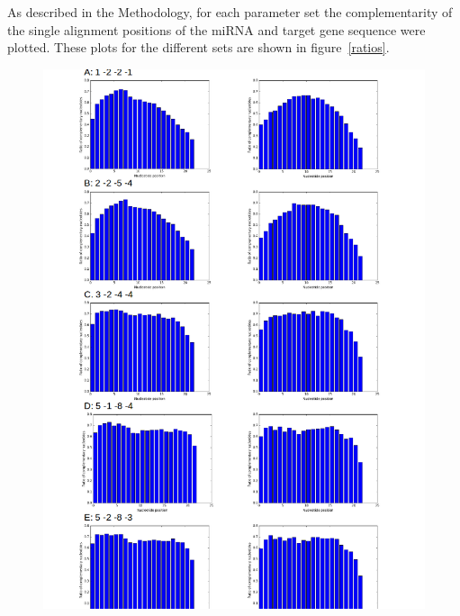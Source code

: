 \documentclass[12pt]{article}
\begin{document}
As described in the Methodology, for each parameter set the complementarity of the single alignment positions of the miRNA and target gene sequence were plotted. These plots for the different sets are shown in figure~\ref{ratios}.

\begin{figure}
\vspace{-1cm}
\includegraphics[scale=0.65]{results/compl1.png}
\end{figure}
\end{document}

